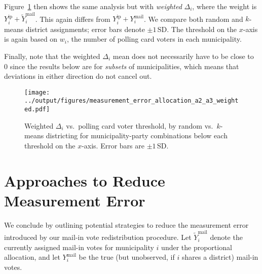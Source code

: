 \documentclass[12pt]{article}
\newcommand{\ip}{\text{ip}}
\newcommand{\mail}{\text{mail}}
\begin{document}
Figure~\ref{fig:measurement_error_allocation_a2_a3_weighted} then shows the same analysis but with \emph{weighted} $\Delta_i$, where the weight is $Y_i^{\ip} + \widetilde{Y}_i^{\mail}$. This again differs from $Y_i^{\ip} + Y_i^{\mail}$. We compare both random and $k$-means district assignments; error bars denote $\pm 1$\,SD. The threshold on the $x$-axis is again based on $w_i$, the number of polling card voters in each municipality.

Finally, note that the weighted $\Delta_i$ mean does not necessarily have to be close to $0$ since the results below are for \textit{subsets} of municipalities, which means that deviations in either direction do not cancel out.

\begin{figure}[!h]
\centering
\texttt{[image: ../output/figures/measurement\_error\_allocation\_a2\_a3\_weighted.pdf]}
\caption{Weighted $\Delta_i$ vs.\ polling card voter threshold, by random vs.\ $k$-means districting for municipality-party combinations below each threshold on the $x$-axis. Error bars are $\pm 1$\,SD.}
\label{fig:measurement_error_allocation_a2_a3_weighted}
\end{figure}

\section{Approaches to Reduce Measurement Error}

We conclude by outlining potential strategies to reduce the measurement error introduced by our mail-in vote redistribution procedure. Let $\widetilde{Y}_i^{\mail}$ denote the currently assigned mail-in votes for municipality $i$ under the proportional allocation, and let $Y_i^{\mail}$ be the true (but unobserved, if $i$ shares a district) mail-in votes.
\end{document}
